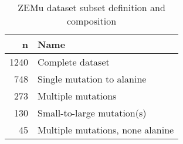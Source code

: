 \begin{table}
  \begin{tabular}{rl}
\toprule
    n &                              Name \\
\midrule
 1240 &                  Complete dataset \\
  748 &        Single mutation to alanine \\
  273 &                Multiple mutations \\
  130 &        Small-to-large mutation(s) \\
   45 &  Multiple mutations, none alanine \\
\bottomrule
\end{tabular}

  \caption[]{ZEMu dataset subset definition and composition} \label{tab:table-composition}
\end{table}
